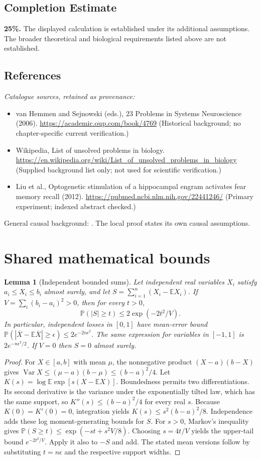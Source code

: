 \documentclass[11pt]{article}
\newcommand{\E}{\mathbb E}
\newcommand{\Prob}{\mathbb P}
\DeclareMathOperator{\Var}{Var}
\providecommand{\E}{\mathbb E}
\providecommand{\Prob}{\mathbb P}
\providecommand{\Var}{\operatorname{Var}}
\newtheorem{sharedlemma}{Lemma}[section]
\begin{document}
\subsection{Completion Estimate}
\textbf{25\%.} The displayed calculation is established under its additional assumptions. The broader theoretical and biological requirements listed above are not established.
\subsection{References}
\noindent\emph{Catalogue sources, retained as provenance:}
\begin{itemize}
\item van Hemmen and Sejnowski (eds.), 23 Problems in Systems Neuroscience (2006). \url{https://academic.oup.com/book/4769} (Historical background; no chapter-specific current verification.)
\item Wikipedia, List of unsolved problems in biology. \url{https://en.wikipedia.org/wiki/List_of_unsolved_problems_in_biology} (Supplied background list only; not used for scientific verification.)
\item Liu et al., Optogenetic stimulation of a hippocampal engram activates fear memory recall (2012). \url{https://pubmed.ncbi.nlm.nih.gov/22441246/} (Primary experiment; indexed abstract checked.)
\end{itemize}
\noindent General causal background: \cite{pearl}. The local proof states its own causal assumptions.
\clearpage


\appendix
\section{Shared mathematical bounds}\label{app:bounds}
\begin{sharedlemma}[Independent bounded sums]\label{lem:bounded}
Let independent real variables $X_i$ satisfy $a_i\leq X_i\leq b_i$ almost surely,
and let $S=\sum_{i=1}^n(X_i-\E X_i)$. If
$V=\sum_i(b_i-a_i)^2>0$, then for every $t>0$,
\[
 \Prob(|S|\geq t)\leq 2\exp(-2t^2/V).
\]
In particular, independent losses in $[0,1]$ have mean-error bound
$\Prob(|\overline X-\E\overline X|\geq\epsilon)
\leq2e^{-2n\epsilon^2}$. The same expression for variables in $[-1,1]$
is $2e^{-n\epsilon^2/2}$. If $V=0$ then $S=0$ almost surely.
\end{sharedlemma}
\begin{proof}
For $X\in[a,b]$ with mean $\mu$, the nonnegative product
$(X-a)(b-X)$ gives
$\Var X\leq(\mu-a)(b-\mu)\leq(b-a)^2/4$.
Let $K(s)=\log\E\exp[s(X-\E X)]$.
Boundedness permits two differentiations. Its second derivative is the variance
under the exponentially tilted law, which has the same support, so
$K''(s)\leq(b-a)^2/4$ for every real $s$.
Because $K(0)=K'(0)=0$, integration yields
$K(s)\leq s^2(b-a)^2/8$.
Independence adds these log moment-generating bounds for $S$.
For $s>0$, Markov's inequality gives
$\Prob(S\geq t)\leq\exp(-st+s^2V/8)$.
Choosing $s=4t/V$ yields the upper-tail bound $e^{-2t^2/V}$.
Apply it also to $-S$ and add. The stated mean versions follow by substituting
$t=n\epsilon$ and the respective support widths.
\end{proof}
\end{document}
